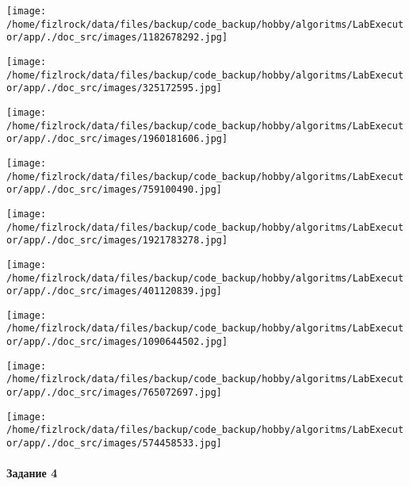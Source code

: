 \documentclass[a4paper, 12pt]{article}
\begin{document}
\texttt{[image: /home/fizlrock/data/files/backup/code\_backup/hobby/algoritms/LabExecutor/app/./doc\_src/images/1182678292.jpg]}

\texttt{[image: /home/fizlrock/data/files/backup/code\_backup/hobby/algoritms/LabExecutor/app/./doc\_src/images/325172595.jpg]}

\texttt{[image: /home/fizlrock/data/files/backup/code\_backup/hobby/algoritms/LabExecutor/app/./doc\_src/images/1960181606.jpg]}

\texttt{[image: /home/fizlrock/data/files/backup/code\_backup/hobby/algoritms/LabExecutor/app/./doc\_src/images/759100490.jpg]}

\texttt{[image: /home/fizlrock/data/files/backup/code\_backup/hobby/algoritms/LabExecutor/app/./doc\_src/images/1921783278.jpg]}

\texttt{[image: /home/fizlrock/data/files/backup/code\_backup/hobby/algoritms/LabExecutor/app/./doc\_src/images/401120839.jpg]}

\texttt{[image: /home/fizlrock/data/files/backup/code\_backup/hobby/algoritms/LabExecutor/app/./doc\_src/images/1090644502.jpg]}

\texttt{[image: /home/fizlrock/data/files/backup/code\_backup/hobby/algoritms/LabExecutor/app/./doc\_src/images/765072697.jpg]}

\texttt{[image: /home/fizlrock/data/files/backup/code\_backup/hobby/algoritms/LabExecutor/app/./doc\_src/images/574458533.jpg]}
\pagebreak
\paragraph{Задание 4}
\end{document}
